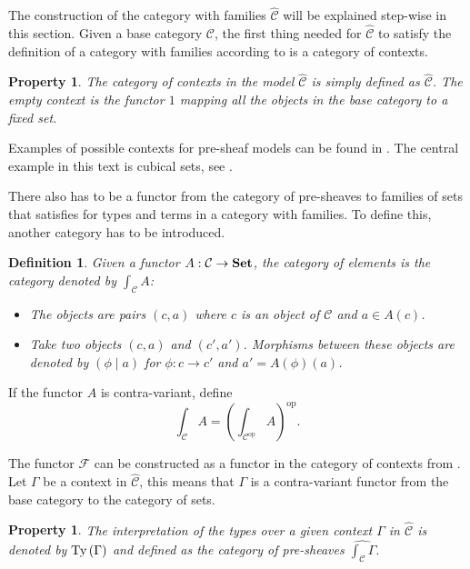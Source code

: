 \documentclass[12pt,a4paper,twoside,xetex]{book} %
\newcommand{\keyword}[1]{\emph{#1}\index{#1}}
\newtheorem{definition}[theorem]{Definition}
\newtheorem{property}[theorem]{Property}
\newcommand{\psh}[1]{\widehat{#1}}
\newcommand{\coe}[2]{\int_{#1}{#2}}
\begin{document}
The construction of the category with families $\psh{\mathcal{C}}$ will be explained step-wise in this section.
Given a base category $\mathcal{C}$, the first thing needed for $\psh{\mathcal{C}}$ to satisfy the definition of a 
category with families according to  is a category of contexts. 

\begin{property}\label{precon}
  The category of contexts in the model $\psh{\mathcal{C}}$ is simply defined as $\psh{\mathcal{C}}$. The empty context is 
the functor $1$ mapping all the objects in the base category to a fixed set. 
\end{property}

Examples of possible contexts for pre-sheaf models can be found in . The central example in this text is cubical sets, see . 

There also has to be a functor from the category of pre-sheaves to families of 
sets that satisfies  for types and terms in a category with 
families. To define this, another category has to be introduced.

\begin{definition}\label{catel}
Given a functor $A:\mathcal{C} \rightarrow \text{\textbf{Set}}$, the \keyword{category of 
elements} is the category denoted by $\int_{\mathcal{C}} A$:

\begin{itemize}
\item The objects are pairs $(c,a)$ where $c$ is an object of $\mathcal{C}$ and 
$a\in A(c)$.
\item Take two objects $(c,a)$ and $(c',a')$. Morphisms between these objects 
are denoted by $(\phi \mid a)$ for $\phi : c \rightarrow c'$ and $a' = 
A(\phi)(a)$.
\end{itemize}
\end{definition}

If the functor $A$ is contra-variant, define $$\coe{\mathcal{C}}{A} = 
\left(\coe{\mathcal{C}^{\text{op}}}{A} \right)^{\text{op}}.$$

The functor $\mathcal{F}$ can be constructed as a functor in the category of 
contexts from . Let $\Gamma$ be a context in $\psh{\mathcal{C}}$, this means that $\Gamma$ is a contra-variant functor from the base 
category to the category of sets. 

\begin{property}\label{prety}
The interpretation of the types over a given context $\Gamma$ in $\psh{\mathcal{C}}$ is denoted by $\text{Ty}\left(\Gamma\right)$ and defined as the category of pre-sheaves $\psh{\coe{\mathcal{C}}{\Gamma}}.$
\end{property}
\end{document}
